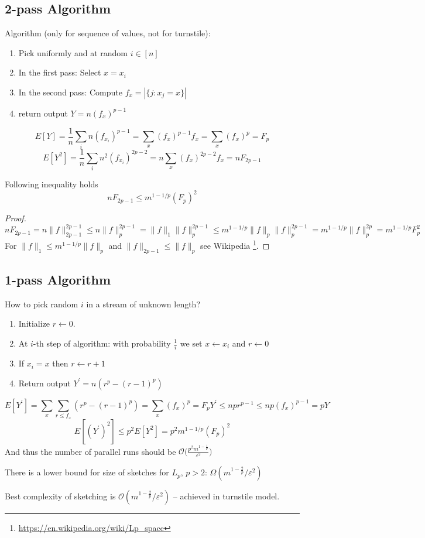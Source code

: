 \documentclass[11pt]{article}
\begin{document}
\subsection{2-pass Algorithm}
Algorithm (only for sequence of values, not for turnstile):
  \begin{enumerate}
    \item Pick uniformly and at random $i \in [n]$
    \item In the first pass: Select $x = x_i$
    \item In the second pass: Compute $f_{x} = |\{ j : x_j = x \}|$
    \item return output $Y = n (f_x)^{p-1}$
  \end{enumerate}
$$E[Y] = \frac{1}{n}\sum_{i} n(f_{x_i})^{p-1} = \sum_{x} (f_x)^{p-1} f_x = \sum_{x} (f_x)^p = F_p$$
$$E[Y^2] = \frac{1}{n}\sum_{i}n^2 (f_{x_i})^{2p-2} = n \sum_{x} (f_x)^{2p-2} f_x = n F_{2p-1}$$

\begin{claim}
  Following inequality holds $$n F_{2p-1} \leq m^{1-1/p} (F_p)^2$$
\end{claim}
\begin{proof}
$$nF_{2p-1} = n \|f\|_{2p-1}^{2p-1} \leq n \|f\|_{p}^{2p-1} = \|f\|_1 \|f\|_p^{2p-1} \leq m^{1 - 1/p} \|f\|_p \|f\|_p^{2p-1} = m^{1 - 1/p} \|f\|_p^{2p} = m^{1 - 1/p} F_p^2$$
For $\|f\|_1 \leq m^{1 - 1/p} \|f\|_p$ and $\|f\|_{2p-1} \le \|f\|_p$ see Wikipedia \footnote{\url{https://en.wikipedia.org/wiki/Lp_space}}.
\end{proof}
\subsection{1-pass Algorithm}
How to pick random $i$ in a stream of unknown length?
\begin{enumerate}
  \item Initialize $r \gets 0$.
  \item At $i$-th step of algorithm: with probability $\frac{1}{i}$ we set $x \gets x_i$ and $r \gets 0$
  \item If $x_{i} = x$ then $r \gets r + 1$
  \item Return output $Y^\prime = n(r^p - (r-1)^{p})$
\end{enumerate}
$$E[Y^\prime] = \sum_x \sum_{r \leq f_x} (r^p-(r-1)^{p}) = \sum_x (f_x)^p = F_p
Y^\prime \leq n p r^{p-1} \leq n p (f_x)^{p-1} = p Y$$
$$E[(Y^\prime)^2] \leq p^2 E[Y^2] = p^2 m^{1-1/p} (F_p)^2$$
And thus the number of parallel runs should be $\mathcal{O}\Big(\frac{p^2 m^{1 - \frac{1}{p}}}{\varepsilon^2}\Big)$

\begin{fact}
  There is a lower bound for size of sketches for $L_p$, $p > 2$: $\Omega(m^{1-\frac{2}{p}}/\varepsilon^2)$ \cite{DBLP:journals/jcss/Bar-YossefJKS04}
\end{fact}
\begin{fact}
  Best complexity of sketching is $\mathcal{O}(m^{1-\frac{2}{p}}/\varepsilon^2)$ -- achieved in turnstile model. \cite{DBLP:conf/stoc/IndykW05}
\end{fact}



\end{document}
